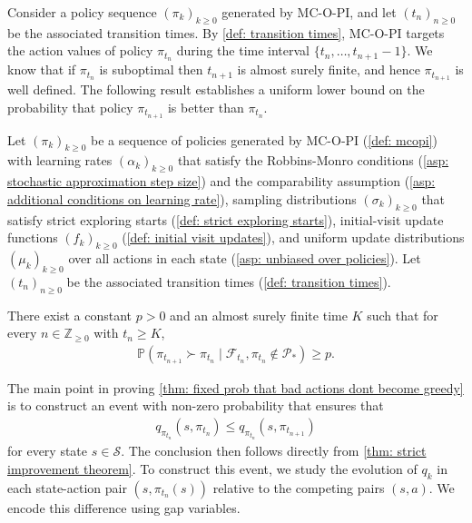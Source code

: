 Consider a policy sequence $(\pi_k)_{k \ge 0}$ generated by MC-O-PI, and let $(t_n)_{n \ge 0}$ be the associated transition times.
By \autoref{def: transition times}, MC-O-PI targets the action values of policy $\pi_{t_n}$ during the time interval $\{t_n, \dots, t_{n+1}-1\}$.
We know that if $\pi_{t_n}$ is suboptimal then $t_{n+1}$ is almost surely finite, and hence $\pi_{t_{n+1}}$ is well defined.
The following result establishes a uniform lower bound on the probability that policy $\pi_{t_{n+1}}$ is better than $\pi_{t_{n}}$.

\begin{proposition}
\label{thm: fixed prob that bad actions dont become greedy}
    Let \((\pi_k)_{k\ge 0}\) be a sequence of policies generated by MC-O-PI (\autoref{def: mcopi})
    with
    learning rates $(\alpha_k)_{k \ge 0}$ that satisfy the Robbins-Monro conditions (\autoref{asp: stochastic approximation step size}) and the comparability assumption (\autoref{asp: additional conditions on learning rate}),
    sampling distributions $(\sigma_k)_{k \ge 0}$ that satisfy strict exploring starts (\autoref{def: strict exploring starts}),
    initial-visit update functions $(f_k)_{k \ge 0}$ (\autoref{def: initial visit updates}),
    and uniform update distributions $(\mu_k)_{k \ge 0}$ over all actions in each state (\autoref{asp: unbiased over policies}).
    Let \((t_n)_{n\ge 0}\) be the associated transition times (\autoref{def: transition times}).
    
    There exist a constant $p>0$ and an almost surely finite time $K$ such that
    for every $n \in \mathbb Z_{\ge 0}$ with $t_n \ge K$,
    \begin{align}
    \label{eq: porb better action value}
    \mathbb P \left(
    \pi_{t_{n+1}} \succ \pi_{t_n}
    \mid \mathcal F_{t_n}, \pi_{t_n} \notin \mathcal P_* \right) \ge p .
    \end{align}
\end{proposition}
\vspace{-0.6cm}

The main point in proving \autoref{thm: fixed prob that bad actions dont become greedy} is to construct an event with non-zero probability that ensures that
\begin{align}
\label{eq: goal of proof stoch improvement}
q_{\pi_{t_n}} ( s,\pi_{t_n} ) \le q_{\pi_{t_n}} ( s, \pi_{t_{n+1}} ) 
\end{align}
for every state $s \in \mathcal S$.
The conclusion then follows directly from \autoref{thm: strict improvement theorem}.
To construct this event, we study the evolution of $q_{k}$ in each state-action pair $(s,\pi_{t_n}(s))$ relative to the competing pairs $(s,a)$. We encode this difference using gap variables.


